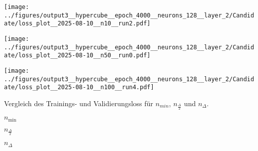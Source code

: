 \begin{otherlanguage}{ngerman}
\begin{samepage}
\begin{minipage}{\textwidth}
\vspace{0.125cm}

\begin{minipage}{0.05\textwidth}\centering{}\end{minipage}%
\begin{minipage}{0.3\textwidth}
    \centering
    \texttt{[image: ../figures/output3\_\_hypercube\_\_epoch\_4000\_\_neurons\_128\_\_layer\_2/Candidate/loss\_plot\_\_2025-08-10\_\_n10\_\_run2.pdf]}
\end{minipage}%
\begin{minipage}{0.3\textwidth}
    \centering
    \texttt{[image: ../figures/output3\_\_hypercube\_\_epoch\_4000\_\_neurons\_128\_\_layer\_2/Candidate/loss\_plot\_\_2025-08-10\_\_n50\_\_run0.pdf]}
\end{minipage}%
\begin{minipage}{0.3\textwidth}
    \centering
    \texttt{[image: ../figures/output3\_\_hypercube\_\_epoch\_4000\_\_neurons\_128\_\_layer\_2/Candidate/loss\_plot\_\_2025-08-10\_\_n100\_\_run4.pdf]}
\end{minipage}

\caption{Vergleich des Trainings- und Validierungsloss für $n_{min}$, $n_{\frac{\Delta}{2}}$ und $n_{\Delta}$.}
\label{fig:matrix_plot}

\begin{minipage}{0.05\textwidth}\vspace{0.5cm}\end{minipage}%
\begin{minipage}{0.3\textwidth}\centering \textbf{$n_{\mathrm{min}}$}\end{minipage}%
\begin{minipage}{0.3\textwidth}\centering \textbf{$n_{\frac{\Delta}{2}}$}\end{minipage}%
\begin{minipage}{0.3\textwidth}\centering \textbf{$n_{\Delta}$}\end{minipage}

\vspace{0.125cm}


\end{minipage}
\end{samepage}
\end{otherlanguage}
